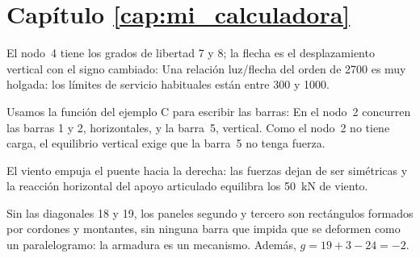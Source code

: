 \section*{Capítulo \ref{cap:mi_calculadora}}

El nodo~4 tiene los grados de libertad 7 y 8; la flecha es el desplazamiento
vertical con el signo cambiado:
Una relación luz/flecha del orden de 2700 es muy holgada: los límites de
servicio habituales están entre 300 y 1000.

Usamos la función  del ejemplo C para escribir las barras:
En el nodo~2 concurren las barras 1 y 2, horizontales, y la barra~5,
vertical. Como el nodo~2 no tiene carga, el equilibrio vertical exige que la
barra~5 no tenga fuerza.

El viento empuja el puente hacia la derecha: las fuerzas dejan de ser
simétricas y la reacción horizontal del apoyo articulado equilibra los
\SI{50}{\kilo\newton} de viento.

Sin las diagonales 18 y 19, los paneles segundo y tercero son rectángulos
formados por cordones y montantes, sin ninguna barra que impida que se
deformen como un paralelogramo: la armadura es un mecanismo. Además,
$g = 19 + 3 - 24 = -2$.
